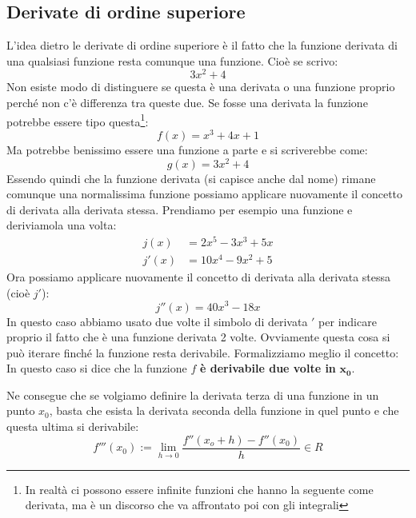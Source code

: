 \subsection{Derivate di ordine superiore}
L'idea dietro le derivate di ordine superiore è il fatto che la funzione 
derivata di una qualsiasi funzione resta comunque una funzione. Cioè se scrivo:
\begin{equation*}
	3x^2 + 4
\end{equation*}
Non esiste modo di distinguere se questa è una derivata o una funzione proprio 
perché non c'è differenza tra queste due. Se fosse una derivata la funzione 
potrebbe essere tipo questa\footnote{In realtà ci possono essere infinite 
funzioni che hanno la seguente come derivata, ma è un discorso che va 
affrontato poi con gli integrali}:
\begin{equation*}
	f(x) = x^3 + 4x + 1
\end{equation*}
Ma potrebbe benissimo essere una funzione a parte e si scriverebbe come:
\begin{equation*}
	g(x) = 3x^2 + 4
\end{equation*}
Essendo quindi che la funzione derivata (si capisce anche dal nome) rimane 
comunque una normalissima funzione possiamo applicare nuovamente il concetto di 
derivata alla derivata stessa. Prendiamo per esempio una funzione e deriviamola 
una volta:
\begin{align*}
	j(x) &= 2x^5 - 3x^3 + 5x\\
	j'(x) &= 10x^4 - 9x^2 +5
\end{align*}
Ora possiamo applicare nuovamente il concetto di derivata alla derivata stessa 
(cioè $j'$):
\begin{equation*}
	j''(x) = 40x^3 - 18x
\end{equation*}
In questo caso abbiamo usato due volte il simbolo di derivata $'$ per indicare 
proprio il fatto che è una funzione derivata 2 volte. Ovviamente questa cosa si 
può iterare finché la funzione resta derivabile. Formalizziamo meglio il 
concetto:
In questo caso si dice che la funzione $f$ \textbf{è derivabile due volte in} 
$\mathbf{x_0}$.

Ne consegue che se volgiamo definire la derivata terza di una funzione in un 
punto $x_0$, basta che esista la derivata seconda della funzione in quel punto 
e che questa ultima si derivabile:
\begin{equation*}
		f'''(x_0) := \lim_{h \to 0} \dfrac{f''(x_o + h) - f''(x_0)}{h} \in R
\end{equation*}

